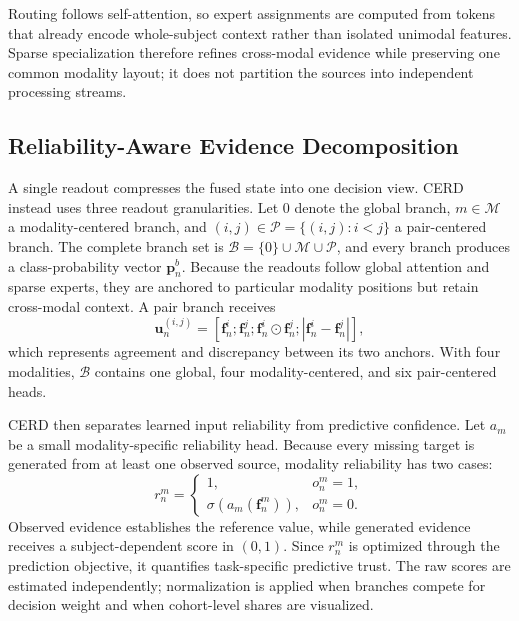 \documentclass[a4paper,fleqn]{cas-dc}
\begin{document}
Routing follows self-attention, so expert assignments are computed from tokens that already encode whole-subject context rather than isolated unimodal features. Sparse specialization therefore refines cross-modal evidence while preserving one common modality layout; it does not partition the sources into independent processing streams.

\subsection{Reliability-Aware Evidence Decomposition}
\label{sec:evidence_fusion}

A single readout compresses the fused state into one decision view. CERD instead uses three readout granularities. Let \(0\) denote the global branch, \(m\in\mathcal M\) a modality-centered branch, and \((i,j)\in\mathcal P=\{(i,j):i<j\}\) a pair-centered branch. The complete branch set is \(\mathcal B=\{0\}\cup\mathcal M\cup\mathcal P\), and every branch produces a class-probability vector \(\mathbf p_n^b\). Because the readouts follow global attention and sparse experts, they are anchored to particular modality positions but retain cross-modal context. A pair branch receives
\begin{equation}
\mathbf u_n^{(i,j)}=
\left[\mathbf f_n^i;\mathbf f_n^j;
\mathbf f_n^i\odot\mathbf f_n^j;
|\mathbf f_n^i-\mathbf f_n^j|\right],
\label{eq:pair_feature}
\end{equation}
which represents agreement and discrepancy between its two anchors. With four modalities, \(\mathcal B\) contains one global, four modality-centered, and six pair-centered heads.

CERD then separates learned input reliability from predictive confidence. Let \(a_m\) be a small modality-specific reliability head. Because every missing target is generated from at least one observed source, modality reliability has two cases:
\begin{equation}
r_n^m=
\begin{cases}
1, & o_n^m=1,\\
\sigma\!\left(a_m(\mathbf f_n^m)\right), & o_n^m=0.
\end{cases}
\label{eq:modality_reliability}
\end{equation}
Observed evidence establishes the reference value, while generated evidence receives a subject-dependent score in \((0,1)\). Since \(r_n^m\) is optimized through the prediction objective, it quantifies task-specific predictive trust. The raw scores are estimated independently; normalization is applied when branches compete for decision weight and when cohort-level shares are visualized.
\end{document}
